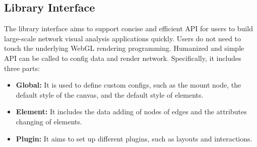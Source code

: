\subsection{Library Interface}
The library interface aims to support concise and efficient API for users to build large-scale network visual analysis applications quickly.
Users do not need to touch the underlying WebGL rendering programming. Humanized and simple API can be called to config data and render network.
Specifically, it includes three parts:
\begin{itemize}
    \item \textbf{Global: }It is used to define custom configs, such as the mount node, the default style of the canvas, and the default style of elements.
    \item  \textbf{Element: }It includes the data adding of nodes of edges and the attributes changing of elements.
    \item  \textbf{Plugin: }It aims to set up different plugins, such as layouts and interactions.
\end{itemize}
